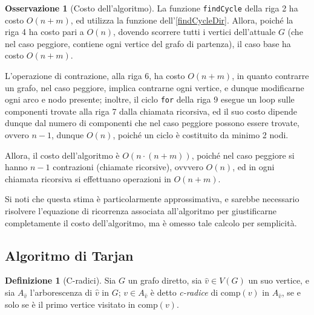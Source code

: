 \documentclass[14pt]{extreport}
\theoremstyle{definition}
\newtheorem{definition}{Definizione}[subsection]
\theoremstyle{definition}
\newtheorem{remark}{Osservazione}[subsection]
\begin{document}
\begin{remark}[Costo dell'algoritmo]
    La funzione \texttt{findCycle} della riga 2 ha costo $O(n + m)$, ed utilizza la funzione dell'\cref{findCycleDir}. Allora, poiché la riga 4 ha costo pari a $O(n)$, dovendo scorrere tutti i vertici dell'attuale $G$ (che nel caso peggiore, contiene ogni vertice del grafo di partenza), il caso base ha costo $O(n+ m)$.

    L'operazione di contrazione, alla riga 6, ha costo $O(n+m)$, in quanto contrarre un grafo, nel caso peggiore, implica contrarne ogni vertice, e dunque modificarne ogni arco e nodo presente; inoltre, il ciclo \texttt{for} della riga 9 esegue un loop sulle componenti trovate alla riga 7 dalla chiamata ricorsiva, ed il suo costo dipende dunque dal numero di componenti che nel caso peggiore possono essere trovate, ovvero $n - 1$, dunque $O(n)$, poiché un ciclo è costituito da minimo 2 nodi.

    Allora, il costo dell'algoritmo è $O(n \cdot (n + m))$, poiché nel caso peggiore si hanno $n - 1$ contrazioni (chiamate ricorsive), ovvvero $O(n)$, ed in ogni chiamata ricorsiva si effettuano operazioni in $O(n + m)$.

    Si noti che questa stima è particolarmente approssimativa, e sarebbe necessario risolvere l'equazione di ricorrenza associata all'algoritmo per giustificarne completamente il costo dell'algoritmo, ma è omesso tale calcolo per semplicità.
\end{remark}

\subsection{Algoritmo di Tarjan}

\begin{definition}[C-radici]
    Sia $G$ un grafo diretto, sia $\hat v \in V(G)$ un suo vertice, e sia $A_{\hat v}$ l'arborescenza di $\hat v$ in $G$; $v \in A_{\hat v}$ è detto \textit{c-radice} di $\mathrm{comp}(v)$ in $A_{\hat v}$, se e solo se è il primo vertice visitato in $\mathrm{comp}(v)$.
\end{definition}
\end{document}
